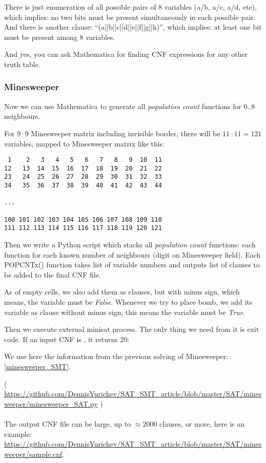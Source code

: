 There is just enumeration of all possible pairs of 8 variables (a/b, a/c, a/d, etc), which implies:
no two bits must be present simultaneously in each possible pair.
And there is another clause: ``(a||b||c||d||e||f||g||h)'', which implies:
at least one bit must be present among 8 variables.

And yes, you can ask Mathematica for finding \ac{CNF} expressions for any other truth table.

\subsubsection{Minesweeper}

Now we can use Mathematica to generate all \textit{population count} functions for 0..8 neighbours.

For $9 \cdot 9$ Minesweeper matrix including invisible border, there will be $11 \cdot 11=121$ variables,
mapped to Minesweeper matrix like this:

\begin{lstlisting}
 1    2   3   4   5   6   7   8   9  10  11
12   13  14  15  16  17  18  19  20  21  22
23   24  25  26  27  28  29  30  31  32  33
34   35  36  37  38  39  40  41  42  43  44

...

100 101 102 103 104 105 106 107 108 109 110
111 112 113 114 115 116 117 118 119 120 121
\end{lstlisting}

Then we write a Python script which stacks all \textit{population count} functions:
each function for each known number of neighbours (digit on Minesweeper field).
Each POPCNTx() function takes list of variable numbers and outputs list of clauses to be added to the final \ac{CNF} file.

As of empty cells, we also add them as clauses, but with minus sign, which means, the variable must be \textit{False}.
Whenever we try to place bomb, we add its variable as clause without minus sign, this means the variable must be \textit{True}.

Then we execute external minisat process.
The only thing we need from it is exit code.
If an input \ac{CNF} is , it returns 20:

We use here the information from the previous solving of Minesweeper: \ref{minesweeper_SMT}.



( \url{https://github.com/DennisYurichev/SAT_SMT_article/blob/master/SAT/minesweeper/minesweeper_SAT.py} ) \\
\\
The output \ac{CNF} file can be large, up to $\approx 2000$ clauses, or more, here is an example: \url{https://github.com/DennisYurichev/SAT_SMT_article/blob/master/SAT/minesweeper/sample.cnf}.

